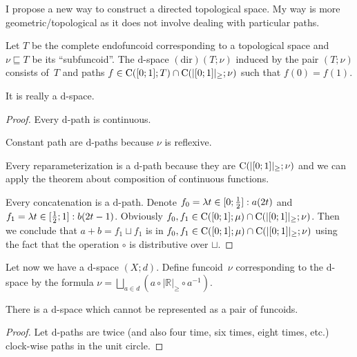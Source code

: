 I propose a new way to construct a directed topological space. My way is more geometric/topological as it does not involve dealing with particular paths.

\begin{defn}
Let $ T$ be the complete endofuncoid corresponding to a topological space
and $\nu\sqsubseteq T$ be its ``subfuncoid''. The $\mathrm{d}$-space $\operatorname{(dir)}(T;\nu)$ induced by the pair $(T;\nu)$
consists of~$ T$ and paths $f\in\mathrm{C}([0;1]; T) \cap \mathrm{C}(|[0;1]|_{\geq}; \nu)$
such that $f(0)=f(1)$.
\end{defn}

\begin{prop}
It is really a $\mathrm{d}$-space.
\end{prop}

\begin{proof}
Every $\mathrm{d}$-path is continuous.

Constant path are $\mathrm{d}$-paths because $\nu$ is reflexive.

Every reparameterization is a $\mathrm{d}$-path because they are $\mathrm{C}(|[0;1]|_{\geq}; \nu)$ and we can apply the theorem about
composition of continuous functions.

Every concatenation is a $\mathrm{d}$-path. Denote
$f_0 = \lambda t\in[0;\frac{1}{2}]:a(2t)$ and $f_1 = \lambda t\in[\frac{1}{2};1]:b(2t-1)$.
Obviously $f_0,f_1 \in \mathrm{C}([0;1];\mu) \cap \mathrm{C}(|[0;1]|_{\geq}; \nu)$.
Then we conclude that $a+b = f_1\sqcup f_1$ is in $f_0,f_1 \in \mathrm{C}([0;1];\mu) \cap \mathrm{C}(|[0;1]|_{\geq}; \nu)$
using the fact that the operation $\circ$ is distributive over $\sqcup$.
\end{proof}

Let now we have a $\mathrm{d}$-space $(X;d)$. Define funcoid~$\nu$ corresponding to the $\mathrm{d}$-space by the formula
$\nu = \bigsqcup_{a\in d}(a\circ |\mathbb{R}|_{\geq}\circ a^{-1})$.

\begin{example}
There is a $\mathrm{d}$-space which cannot be represented as a pair of funcoids.
\end{example}

\begin{proof}
Let $\mathrm{d}$-paths are twice (and also four time, six times, eight times, etc.) clock-wise paths in the unit circle.
\end{proof}

